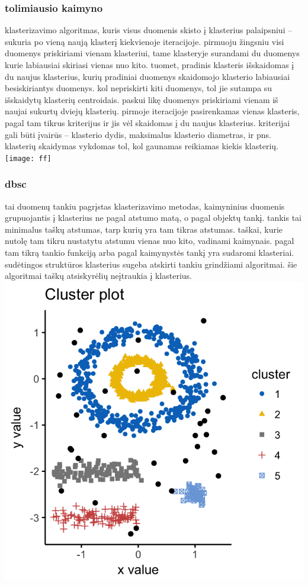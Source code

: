 \documentclass{VUMIFInfKursinis}
\begin{document}
		\subsubsection{tolimiausio kaimyno}
			klasterizavimo algoritmas, kuris visus duomenis skisto į klasterius palaipsniui – sukuria po vieną naują klasterį kiekvienoje iteracijoje. pirmuoju žingsniu visi duomenys priskiriami vienam klasteriui, tame klasteryje surandami du duomenys kurie labiausiai skiriasi vienas nuo kito. tuomet, pradinis klasteris išskaidomas į du naujus klasterius, kurių pradiniai duomenys skaidomojo klasterio labiausiai besiskiriantys duomenys. kol nepriskirti kiti duomenys, tol jie sutampa su išskaidytų klasterių centroidais. paskui likę duomenys priskiriami vienam iš naujai sukurtų dviejų klasterių. pirmoje iteracijoje pasirenkamas vienas klasteris, pagal tam tikrus kriterijus ir jis vėl skaidomas į du naujus klasterius. kriterijai gali būti įvairūs – klasterio dydis, maksimalus klasterio diametras, ir pns. klasterių skaidymas vykdomas tol, kol gaunamas reikiamas kiekis klasterių.\\
			\texttt{[image: ff]}

		\subsubsection{dbsc}
			 tai duomenų tankiu pagrįstas klasterizavimo metodas, kaimyninius duomenis grupuojantis į klasterius ne pagal atstumo matą, o pagal objektų tankį. tankis tai minimalus taškų atstumas, tarp kurių yra tam tikras atstumas. taškai, kurie nutolę tam tikru nustatytu atstumu vienas nuo kito, vadinami kaimynais. pagal tam tikrą tankio funkciją arba pagal kaimynystės tankį yra sudaromi klasteriai. sudėtingos struktūros klasterius sugeba atskirti tankiu grindžiami algoritmai. šie algoritmai taškų atsiskyrėlių neįtraukia į klasterius.
			\includegraphics{dbscan}
\end{document}
